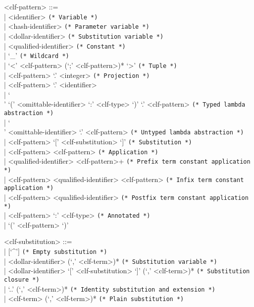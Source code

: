 \documentclass[11pt]{article}
\begin{document}
\begin{grammar}
<clf-pattern> ::= \hfill\\
| <identifier> \hfill \texttt{(* Variable *)}\\
| <hash-identifier> \hfill \texttt{(* Parameter variable *)}\\
| <dollar-identifier> \hfill \texttt{(* Substitution variable *)}\\
| <qualified-identifier> \hfill \texttt{(* Constant *)}\\
| `_' \hfill \texttt{(* Wildcard *)}\\
| `<' <clf-pattern> (`;' <clf-pattern>)* `>' \hfill \texttt{(* Tuple *)}\\
| <clf-pattern> `.' <integer> \hfill \texttt{(* Projection *)}\\
| <clf-pattern> `.' <identifier>\\
| `\\' `(' <omittable-identifier> `:' <clf-type> `)' `.' <clf-pattern> \hfill \texttt{(* Typed lambda abstraction *)}\\
| `\\' <omittable-identifier> `.' <clf-pattern> \hfill \texttt{(* Untyped lambda abstraction *)}\\
| <clf-pattern> `[' <clf-substitution> `]' \hfill \texttt{(* Substitution *)}\\
| <clf-pattern> <clf-pattern> \hfill \texttt{(* Application *)}\\
| <qualified-identifier> <clf-pattern>+ \hfill \texttt{(* Prefix term constant application *)}\\
| <clf-pattern> <qualified-identifier> <clf-pattern> \hfill \texttt{(* Infix term constant application *)}\\
| <clf-pattern> <qualified-identifier> \hfill \texttt{(* Postfix term constant application *)}\\
| <clf-pattern> `:' <clf-type> \hfill \texttt{(* Annotated *)}\\
| `(' <clf-pattern> `)'

<clf-substitution> ::= \hfill\\
| [`^'] \hfill \texttt{(* Empty substitution *)} \\
| <dollar-identifier> (`,' <clf-term>)* \hfill \texttt{(* Substitution variable *)}\\
| <dollar-identifier> `[' <clf-substitution> `]' (`,' <clf-term>)* \hfill \texttt{(* Substitution closure *)}\\
| `..' (`,' <clf-term>)* \hfill \texttt{(* Identity substitution and extension *)}\\
| <clf-term> (`,' <clf-term>)* \hfill \texttt{(* Plain substitution *)}


\end{grammar}
\end{document}
